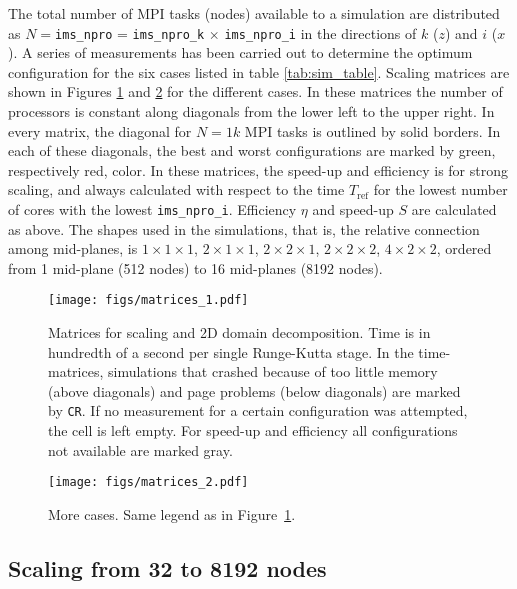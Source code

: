 The total number of MPI tasks (nodes) available to a simulation are distributed
as $N = $\texttt{ims\_npro} = \texttt{ims\_npro\_k}
$\times$ \texttt{ims\_npro\_i} in the directions of $k$ ($z$) and $i$ ($x$). A
series of measurements has been carried out to determine the optimum
configuration for the six cases listed in table
\ref{tab:sim_table}. Scaling matrices are shown in Figures \ref{fig:matrices1}
and \ref{fig:matrices2} for the different cases.  In these matrices the number
of processors is constant along diagonals from the lower left to the upper
right. In every matrix, the diagonal for $N=1k$ MPI tasks is outlined by solid
borders. In each of these diagonals, the best and worst configurations are
marked by green, respectively red, color. In these matrices, the speed-up and
efficiency is for strong scaling, and always calculated with respect to the time
$T_\text{ref}$ for the lowest number of cores with the
lowest \texttt{ims\_npro\_i}. Efficiency $\eta$ and speed-up $S$ are calculated
as above. The shapes used in the simulations, that is, the relative connection
among mid-planes, is $1\times 1\times 1$, $2\times 1\times 1$, $2\times 2\times
1$, $2\times 2\times 2$, $4\times 2\times 2$, ordered from 1 mid-plane (512
nodes) to 16 mid-planes (8192 nodes).

\begin{figure}
\begin{centering}
\texttt{[image: figs/matrices\_1.pdf]}
\caption{Matrices for scaling and 2D domain decomposition. Time is in hundredth
  of a second per single Runge-Kutta stage. In the time-matrices, simulations
  that crashed because of too little memory (above diagonals) and page problems
  (below diagonals) are marked by \texttt{CR}. If no measurement for a certain
  configuration was attempted, the cell is left empty. For speed-up and
  efficiency all configurations not available are marked gray.}
\label{fig:matrices1}
\end{centering}
\end{figure}

\begin{figure}
\begin{centering}
\texttt{[image: figs/matrices\_2.pdf]}
\caption{More cases. Same legend as in Figure~\ref{fig:matrices1}.}
\label{fig:matrices2}
\end{centering}
\end{figure}

\subsection{Scaling from 32 to 8192 nodes}

